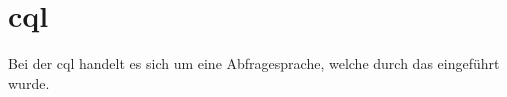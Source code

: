 \section{\acl{cql}}

Bei der \ac{cql} handelt es sich um eine Abfragesprache, welche durch das
 eingeführt wurde.

